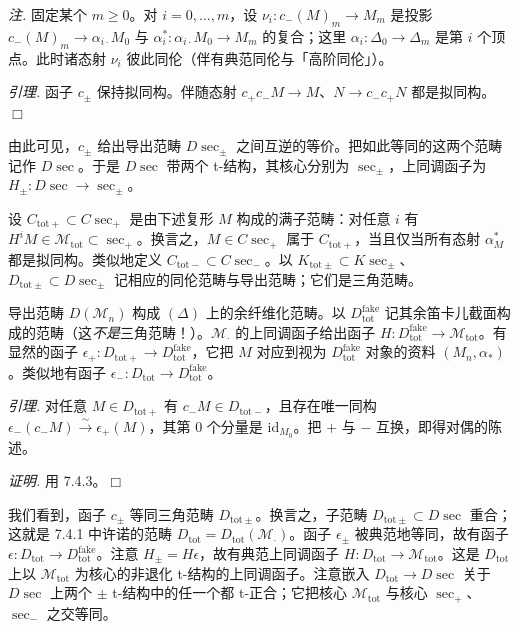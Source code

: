  \emph{注.} 固定某个 $m\ge0$。对 $i=0,\ldots,m$，设 $\nu_{i}:c_{-}(M)_{m}\to M_{m}$ 是投影 $c_{-}(M)_{m}\to\alpha_{i\cdot}M_{0}$ 与 $\alpha^{*}_{i}:\alpha_{i\cdot}M_{0}\to M_{m}$ 的复合；这里 $\alpha_{i}:\Delta_{0}\to\Delta_{m}$ 是第 $i$ 个顶点。此时诸态射 $\nu_{i}$ 彼此同伦（伴有典范同伦与「高阶同伦」）。

 \emph{引理.} 函子 $c_{\pm}$ 保持拟同构。伴随态射 $c_{+}c_{-}M\to M$、$N\to c_{-}c_{+}N$ 都是拟同构。\hfill$\Box$

由此可见，$c_{\pm}$ 给出导出范畴 $D\sec_{\pm}$ 之间互逆的等价。把如此等同的这两个范畴记作 $D\sec$。于是 $D\sec$ 带两个 t-结构，其核心分别为 $\sec_{\pm}$，上同调函子为 $H_{\pm}:D\sec\to\sec_{\pm}$。

 设 $C_{\mathrm{tot}+}\subset C\sec_{+}$ 是由下述复形 $M$ 构成的满子范畴：对任意 $i$ 有 $H^{i}M\in\mathcal{M}_{\mathrm{tot}}\subset\sec_{+}$。换言之，$M\in C\sec_{+}$ 属于 $C_{\mathrm{tot}+}$，当且仅当所有态射 $\alpha^{*}_{M}$ 都是拟同构。类似地定义 $C_{\mathrm{tot}-}\subset C\sec_{-}$。以 $K_{\mathrm{tot}\pm}\subset K\sec_{\pm}$、$D_{\mathrm{tot}\pm}\subset D\sec_{\pm}$ 记相应的同伦范畴与导出范畴；它们是三角范畴。

导出范畴 $D(\mathcal{M}_{n})$ 构成 $(\Delta)$ 上的余纤维化范畴。以 $D^{\mathrm{fake}}_{\mathrm{tot}}$ 记其余笛卡儿截面构成的范畴（这\emph{不是}三角范畴！）。$\mathcal{M}_{\cdot}$ 的上同调函子给出函子 $H:D^{\mathrm{fake}}_{\mathrm{tot}}\to\mathcal{M}_{\mathrm{tot}}$。有显然的函子 $\epsilon_{+}:D_{\mathrm{tot}+}\to D^{\mathrm{fake}}_{\mathrm{tot}}$，它把 $M$ 对应到视为 $D^{\mathrm{fake}}_{\mathrm{tot}}$ 对象的资料 $(M_{n},\alpha_{*})$。类似地有函子 $\epsilon_{-}:D_{\mathrm{tot}}\to D^{\mathrm{fake}}_{\mathrm{tot}}$。

 \emph{引理.} 对任意 $M\in D_{\mathrm{tot}+}$ 有 $c_{-}M\in D_{\mathrm{tot}-}$，且存在唯一同构 $\epsilon_{-}(c_{-}M)\xrightarrow{\sim}\epsilon_{+}(M)$，其第 $0$ 个分量是 $\mathrm{id}_{M_{0}}$。把 $+$ 与 $-$ 互换，即得对偶的陈述。

\emph{证明.} 用 7.4.3。\hfill$\Box$


 我们看到，函子 $c_{\pm}$ 等同三角范畴 $D_{\mathrm{tot}\pm}$。换言之，子范畴 $D_{\mathrm{tot}\pm}\subset D\sec$ 重合；这就是 7.4.1 中许诺的范畴 $D_{\mathrm{tot}}=D_{\mathrm{tot}}(\mathcal{M}_{\cdot})$。函子 $\epsilon_{\pm}$ 被典范地等同，故有函子 $\epsilon:D_{\mathrm{tot}}\to D^{\mathrm{fake}}_{\mathrm{tot}}$。注意 $H_{\pm}=H\epsilon$，故有典范上同调函子 $H:D_{\mathrm{tot}}\to\mathcal{M}_{\mathrm{tot}}$。这是 $D_{\mathrm{tot}}$ 上以 $\mathcal{M}_{\mathrm{tot}}$ 为核心的非退化 t-结构的上同调函子。注意嵌入 $D_{\mathrm{tot}}\to D\sec$ 关于 $D\sec$ 上两个 $\pm$ t-结构中的任一个都 t-正合；它把核心 $\mathcal{M}_{\mathrm{tot}}$ 与核心 $\sec_{+}$、$\sec_{-}$ 之交等同。

